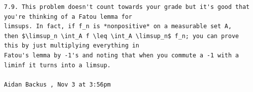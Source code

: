\begin{verbatim}
7.9. This problem doesn't count towards your grade but it's good that you're thinking of a Fatou lemma for
limsups. In fact, if f_n is *nonpositive* on a measurable set A,
then $\limsup_n \int_A f \leq \int_A \limsup_n$ f_n; you can prove this by just multiplying everything in
Fatou's lemma by -1's and noting that when you commute a -1 with a liminf it turns into a limsup.

Aidan Backus , Nov 3 at 3:56pm
\end{verbatim}

